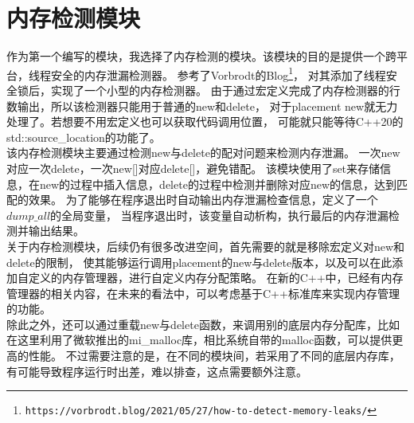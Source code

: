 \section{内存检测模块}

作为第一个编写的模块，我选择了内存检测的模块。该模块的目的是提供一个跨平台，线程安全的内存泄漏检测器。
参考了Vorbrodt的Blog\footnote{\nolinkurl{https://vorbrodt.blog/2021/05/27/how-to-detect-memory-leaks/}}，
对其添加了线程安全锁后，实现了一个小型的内存检测器。
由于通过宏定义完成了内存检测器的行数输出，所以该检测器只能用于普通的new和delete，
对于placement new就无力处理了。若想要不用宏定义也可以获取代码调用位置，
可能就只能等待C++20的std::source\_location的功能了。\\

该内存检测模块主要通过检测new与delete的配对问题来检测内存泄漏。
一次new对应一次delete，一次new[]对应delete[]，避免错配。
该模块使用了set来存储信息，在new的过程中插入信息，delete的过程中检测并删除对应new的信息，达到匹配的效果。
为了能够在程序退出时自动输出内存泄漏检查信息，定义了一个$dump\_all$的全局变量，
当程序退出时，该变量自动析构，执行最后的内存泄漏检测并输出结果。\\





关于内存检测模块，后续仍有很多改进空间，首先需要的就是移除宏定义对new和delete的限制，
使其能够运行调用placement的new与delete版本，以及可以在此添加自定义的内存管理器，进行自定义内存分配策略。
在新的C++中，已经有内存管理器的相关内容，在未来的看法中，可以考虑基于C++标准库来实现内存管理的功能。\\

除此之外，还可以通过重载new与delete函数，来调用别的底层内存分配库，比如在这里利用了微软推出的mi\_malloc库，相比系统自带的malloc函数，可以提供更高的性能。
不过需要注意的是，在不同的模块间，若采用了不同的底层内存库，有可能导致程序运行时出差，难以排查，这点需要额外注意。





